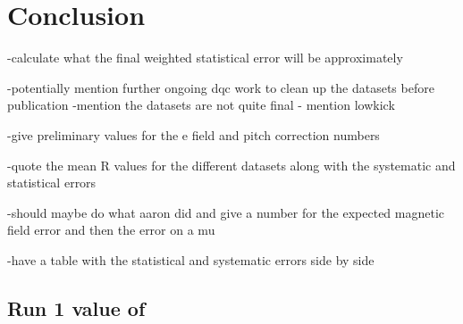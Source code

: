 
\thispagestyle{myheadings} %

\chapter{Conclusion}
\label{chapter:Conclusion}



-calculate what the final weighted statistical error will be approximately

-potentially mention further ongoing dqc work to clean up the datasets before publication
-mention the datasets are not quite final - mention lowkick

-give preliminary values for the e field and pitch correction numbers

-quote the mean R values for the different datasets along with the systematic and statistical errors

-should maybe do what aaron did and give a number for the expected magnetic field error and then the error on a mu

-have a table with the statistical and systematic errors side by side



\section{Run 1 value of \amu}
\label{sec:FinalValue}



\cleardoublepage
